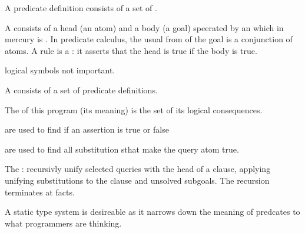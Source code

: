 \begin{compactitem}
\item A predicate definition consists of a set of . 
\item A  consists of a head (an atom) and a body (a goal) speerated by an  which in mercury is \e{$:-$}. In predicate calculus, the usual from of the goal is a conjunction of atoms. A rule is a : it asserts that the head is true if the body is true.
\item logical symbols not important.
\item A  consists of a set of predicate definitions. 
\item The  of this program (its meaning) is the set of its logical consequences.
\item {} are used to find if an assertion is true or false
\item {} are used to find all substitution sthat make the query atom true.
\item The : recursivly unify selected queries with the head of a clause, applying unifying substitutions to the clause and unsolved subgoals. The recursion terminates at facts.
\item A static type system is desireable as it narrows down the meaning of predcates to what programmers are thinking.
\end{compactitem}

